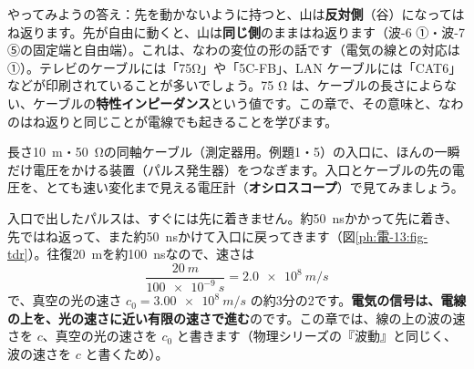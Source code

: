 \noindent やってみようの答え：先を動かないように持つと、山は\textbf{反対側}（谷）になってはね返ります。先が自由に動くと、山は\textbf{同じ側}のままはね返ります（波-6 ①・波-7 ⑤の固定端と自由端）。これは、なわの変位の形の話です（電気の線との対応は①）。テレビのケーブルには「75Ω」や「5C-FB」、LAN ケーブルには「CAT6」などが印刷されていることが多いでしょう。75 Ω は、ケーブルの長さによらない、ケーブルの\textbf{特性インピーダンス}という値です。この章で、その意味と、なわのはね返りと同じことが電線でも起きることを学びます。

\begin{omoidasou}
\end{omoidasou}



\label{ph:電-13:sec1}
長さ\qty{10}{m}・\qty{50}{\ohm}の同軸ケーブル（測定器用。例題1・5）の入口に、ほんの一瞬だけ電圧をかける装置（パルス発生器）をつなぎます。入口とケーブルの先の電圧を、とても速い変化まで見える電圧計（\textbf{オシロスコープ}）で見てみましょう。



\noindent 入口で出したパルスは、すぐには先に着きません。約\qty{50}{ns}かかって先に着き、先ではね返って、また約\qty{50}{ns}かけて入口に戻ってきます（図\ref{ph:電-13:fig-tdr}）。往復\qty{20}{m}を約\qty{100}{ns}なので、速さは
\[\frac{\qty{20}{m}}{\qty{100e-9}{s}}=\qty{2.0e8}{m/s}\]
で、真空の光の速さ $c_0=\qty{3.00e8}{m/s}$ の約3分の2です。\textbf{電気の信号は、電線の上を、光の速さに近い有限の速さで進む}のです。この章では、線の上の波の速さを $c$、真空の光の速さを $c_0$ と書きます（物理シリーズの『波動』と同じく、波の速さを $c$ と書くため）。

